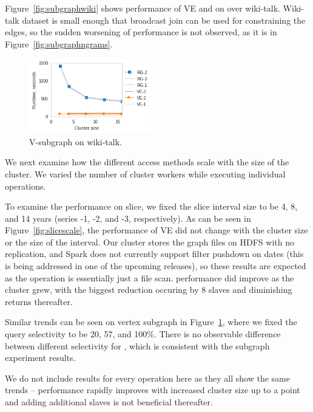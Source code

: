 Figure~\ref{fig:subgraphwiki} shows performance of VE and \sg
on  over wiki-talk.  Wiki-talk dataset is small
enough that broadcast join can be used for constraining the edges, so
the sudden worsening of performance is not observed, as it is in
Figure~\ref{fig:subgraphngrams}.

\begin{figure}
\centering
\includegraphics[width=2.1in]{figs/select_wikitalk_scale_build13.png}
\caption{V-subgraph on wiki-talk.}
\label{fig:selectscale}
\vspace{-0.1in}
\end{figure}

We next examine how the different access methods scale with the size
of the cluster.  We varied the number of cluster workers while
executing individual operations.

To examine the performance on slice, we fixed the slice interval size
to be 4, 8, and 14 years (series -1, -2, and -3, respectively).  As
can be seen in Figure~\ref{fig:slicescale}, the performance of VE did
not change with the cluster size or the size of the interval.  Our
cluster stores the graph files on HDFS with no replication, and Spark
does not currently support filter pushdown on dates (this is being
addressed in one of the upcoming releases), so these results are
expected as the operation is essentially just a file scan.  \rg
performance did improve as the cluster grew, with the biggest
reduction occuring by 8 slaves and diminishing returns thereafter. 

Similar trends can be seen on vertex subgraph in
Figure~\ref{fig:selectscale}, where we fixed the query selectivity to
be 20, 57, and 100\%.  There is no observable difference between
different selectivity for \rg, which is consistent with the subgraph
experiment results.

We do not include results for every operation here as they all show
the same trends -- performance rapidly improves with increased cluster
size up to a point and adding additional slaves is not beneficial
thereafter.  


